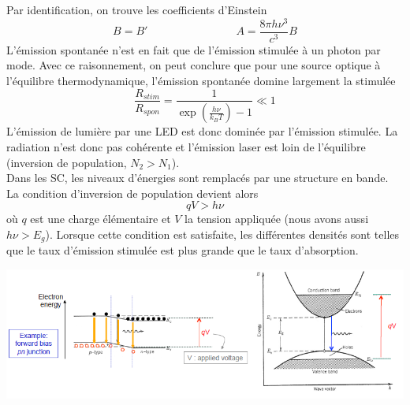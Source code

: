 Par identification, on trouve les coefficients d'Einstein
\begin{equation}
B=B'\qquad\qquad\qquad\qquad A = \frac{{8\pi h{\nu ^3}}}{{{c^3}}}B
\end{equation}
L'émission spontanée n'est en fait que de l'émission stimulée à un photon par mode. Avec ce
raisonnement, on peut conclure que pour une source optique à l'équilibre thermodynamique, 
l'émission spontanée domine largement la stimulée
\begin{equation}
\frac{{{R_{stim}}}}{{{R_{spon}}}} = \frac{1}{{\exp \left( {\frac{{h\nu }}{{{k_B}T}}} \right) - 1}} \ll 1
\end{equation}
L'émission de lumière par une LED est donc dominée par l'émission stimulée. La radiation n'est donc pas cohérente et l'émission laser est loin de l'équilibre (inversion de 
population, $N_2>N_1$).\\

Dans les SC, les niveaux d'énergies sont remplacés par une structure en bande. La condition 
d'inversion de population devient alors
\begin{equation}
qV > h\nu
\end{equation}
où $q$ est une charge élémentaire et $V$ la tension appliquée (nous avons aussi $h\nu>E_g$). Lorsque
cette condition est satisfaite, les différentes densités sont telles que le taux d'émission stimulée
est plus grande que le taux d'absorption.
\begin{center}
	\includegraphics[scale=0.65]{ch4/image5}
\end{center}

